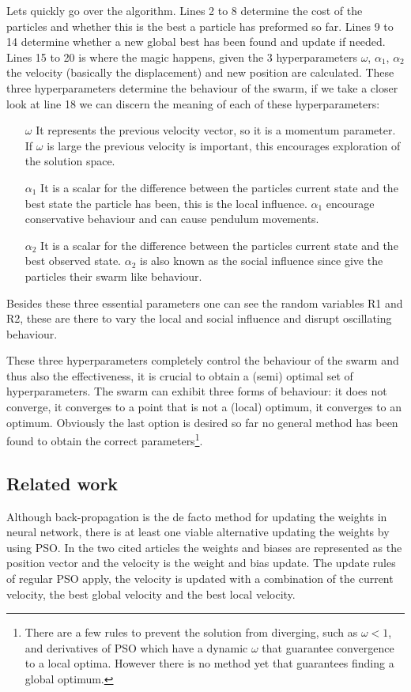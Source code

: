 \documentclass[]{article}
\begin{document}
Lets quickly go over the algorithm. Lines 2 to 8 determine the cost of the particles and whether this is the best a particle has preformed so far. Lines 9 to 14 determine whether a new global best has been found and update if needed. Lines 15 to 20 is where the magic happens, given the 3 hyperparameters $\omega$, $\alpha_1$, $\alpha_2$ the velocity (basically the displacement) and new position are calculated. These three hyperparameters determine the behaviour of the swarm, if we take a closer look at line 18 we can discern the meaning of each of these hyperparameters:
\begin{itemize}
    \item[$\omega$] It represents the previous velocity vector, so it is a momentum parameter. If $\omega$ is large the previous velocity is important, this encourages exploration of the solution space.
    \item[$\alpha_1$] It is a scalar for the difference between the particles current state and the best state the particle has been, this is the local influence. $\alpha_1$ encourage conservative behaviour and can cause pendulum movements.
    \item[$\alpha_2$] It is a scalar for the difference between the particles current state and the best observed state. $\alpha_2$ is also known as the social influence since give the particles their swarm like behaviour. 
\end{itemize}
Besides these three essential parameters one can see the random variables R1 and R2, these are there to vary the local and social influence and disrupt oscillating behaviour. \bigskip

These three hyperparameters completely control the behaviour of the swarm and thus also the effectiveness, it is crucial to obtain a (semi) optimal set of hyperparameters. The swarm can exhibit three forms of behaviour: it does not converge, it converges to a point that is not a (local) optimum, it converges to an optimum. Obviously the last option is desired so far no general method has been found to obtain the correct parameters\footnote{There are a few rules to prevent the solution from diverging, such as $\omega < 1$, and derivatives of PSO which have a dynamic $\omega$ that guarantee convergence to a local optima. However there is no method yet that guarantees finding a global optimum.}.\bigskip

\subsection{Related work}
Although back-propagation is the de facto method for updating the weights in neural network, there is at least one viable alternative updating the weights by using PSO\cite{hara2013neuroevolution, adhikari2013pso}. In the two cited articles the weights and biases are represented as the position vector and the velocity is the weight and bias update. The update rules of regular PSO apply, the velocity is updated with a combination of the current velocity, the best global velocity and the best local velocity.\bigskip
\end{document}
